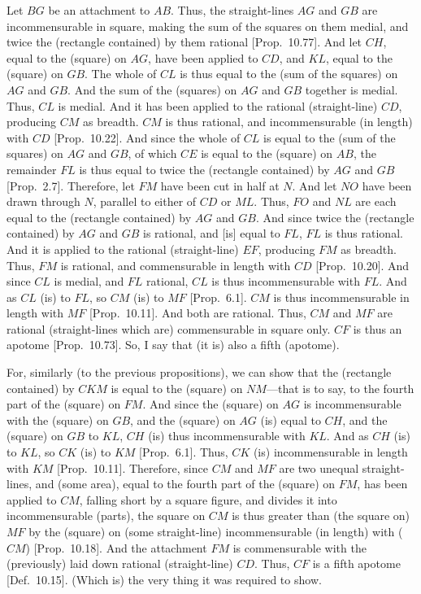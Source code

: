 \begin{Parallel}{}{}
{Let $BG$ be an attachment to $AB$. Thus, the straight-lines $AG$
and $GB$ are incommensurable in square, making the sum of the
squares on them medial, and twice the (rectangle contained) by them
rational [Prop.~10.77]. And let $CH$, equal 
to the (square) on $AG$, have been applied to $CD$, and $KL$, equal
to the (square) on $GB$. The whole of $CL$
is thus equal to the (sum of the squares) on $AG$ and $GB$. 
And the sum of the (squares) on $AG$ and $GB$ together is medial. Thus, $CL$
is medial. And it has been applied to the rational (straight-line) $CD$,
producing $CM$ as breadth. $CM$ is thus rational, and incommensurable
(in length) with $CD$ [Prop.~10.22]. And since the whole
of $CL$ is equal to the (sum of the squares) on $AG$ and $GB$, of
which $CE$ is equal to the (square) on $AB$, the remainder $FL$ is
thus equal to twice the (rectangle contained) by $AG$ and $GB$ [Prop.~2.7]. Therefore, let $FM$ have been
cut in half at $N$. And let $NO$ have been drawn through $N$, parallel
to either of $CD$ or $ML$. Thus, $FO$ and $NL$ are each equal
to the (rectangle contained) by $AG$ and $GB$. And since twice the
(rectangle contained) by $AG$ and $GB$ is rational, and [is]
equal to $FL$, $FL$ is thus rational. And it is applied to the rational
(straight-line) $EF$, producing $FM$ as breadth. Thus, $FM$ is rational,
and commensurable in length with $CD$ [Prop.~10.20]. And since $CL$ is medial, and
$FL$ rational, $CL$ is thus incommensurable with $FL$. 
And as $CL$ (is) to $FL$, so $CM$ (is) to $MF$ [Prop.~6.1]. $CM$ is thus incommensurable in length
with $MF$ [Prop.~10.11]. And both are
rational. Thus, $CM$ and $MF$ are rational (straight-lines which are)
commensurable in square only. $CF$ is thus an apotome [Prop.~10.73].  So, I say that (it is) also
a fifth (apotome).

For, similarly (to the previous propositions), we can show that the
(rectangle contained) by $CKM$ is equal to the (square) on $NM$---that is
to say, to the fourth part of the (square) on $FM$.  And since the (square)
on $AG$ is incommensurable with the (square) on $GB$, and  the
(square) on $AG$ (is)
equal to $CH$, and the (square) on $GB$ to $KL$, $CH$ (is) thus
incommensurable with $KL$. And as $CH$ (is) to $KL$, so
$CK$ (is) to $KM$ [Prop.~6.1]. 
Thus, $CK$ (is) incommensurable in length with $KM$ [Prop.~10.11]. Therefore, since $CM$ and $MF$
are two unequal straight-lines, and (some area), equal to the
fourth part of the (square) on $FM$, has been applied to $CM$, falling
short by a square figure, and divides it into incommensurable
(parts), the square on $CM$ is thus greater than (the square on) $MF$
by the (square) on (some straight-line) incommensurable (in length)
with ($CM$) [Prop.~10.18]. And the attachment
$FM$ is commensurable with the (previously) laid down
rational (straight-line) $CD$. Thus, $CF$ is a fifth apotome [Def.~10.15]. (Which is) the very thing it was required to show.}
\end{Parallel}

